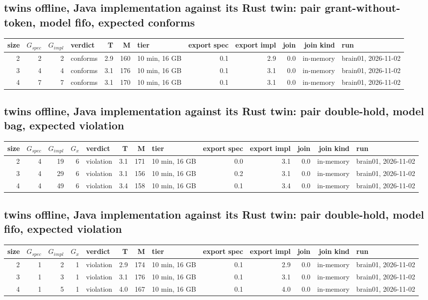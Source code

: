 \documentclass[10pt]{article}
\begin{document}
\subsection*{twins offline, Java implementation against its Rust twin: pair \textsf{grant-without-token}, model fifo, expected conforms}
\begin{longtable}{@{}rrrlrrlrrrrl@{}}
\toprule
size & $G_{\mathit{spec}}$ & $G_{\mathit{impl}}$ & verdict & T & M & tier & export spec & export impl & join & join kind & run \\
\midrule
\endhead
\color{red} 2 & 2 & 2 & conforms & 2.9 & 160 & 10 min, 16 GB & 0.1 & 2.9 & 0.0 & in-memory & brain01, 2026-11-02 \\
\color{red} 3 & 4 & 4 & conforms & 3.1 & 176 & 10 min, 16 GB & 0.1 & 3.1 & 0.0 & in-memory & brain01, 2026-11-02 \\
\color{red} 4 & 7 & 7 & conforms & 3.1 & 170 & 10 min, 16 GB & 0.1 & 3.1 & 0.0 & in-memory & brain01, 2026-11-02 \\
\bottomrule
\end{longtable}
\subsection*{twins offline, Java implementation against its Rust twin: pair \textsf{double-hold}, model bag, expected violation}
\begin{longtable}{@{}rrrrlrrlrrrrl@{}}
\toprule
size & $G_{\mathit{spec}}$ & $G_{\mathit{impl}}$ & $G_x$ & verdict & T & M & tier & export spec & export impl & join & join kind & run \\
\midrule
\endhead
\color{red} 2 & 4 & 19 & 6 & violation & 3.1 & 171 & 10 min, 16 GB & 0.0 & 3.1 & 0.0 & in-memory & brain01, 2026-11-02 \\
\color{red} 3 & 4 & 29 & 6 & violation & 3.1 & 156 & 10 min, 16 GB & 0.2 & 3.1 & 0.0 & in-memory & brain01, 2026-11-02 \\
\color{red} 4 & 4 & 49 & 6 & violation & 3.4 & 158 & 10 min, 16 GB & 0.1 & 3.4 & 0.0 & in-memory & brain01, 2026-11-02 \\
\bottomrule
\end{longtable}
\subsection*{twins offline, Java implementation against its Rust twin: pair \textsf{double-hold}, model fifo, expected violation}
\begin{longtable}{@{}rrrrlrrlrrrrl@{}}
\toprule
size & $G_{\mathit{spec}}$ & $G_{\mathit{impl}}$ & $G_x$ & verdict & T & M & tier & export spec & export impl & join & join kind & run \\
\midrule
\endhead
\color{red} 2 & 1 & 2 & 1 & violation & 2.9 & 174 & 10 min, 16 GB & 0.1 & 2.9 & 0.0 & in-memory & brain01, 2026-11-02 \\
\color{red} 3 & 1 & 3 & 1 & violation & 3.1 & 176 & 10 min, 16 GB & 0.1 & 3.1 & 0.0 & in-memory & brain01, 2026-11-02 \\
\color{red} 4 & 1 & 5 & 1 & violation & 4.0 & 167 & 10 min, 16 GB & 0.1 & 4.0 & 0.0 & in-memory & brain01, 2026-11-02 \\
\bottomrule
\end{longtable}
\end{document}
